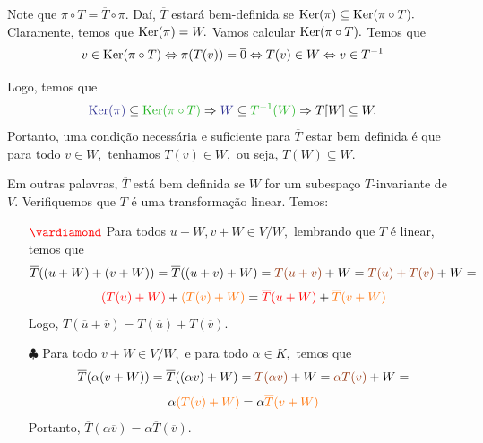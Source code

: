 \documentclass[11pt,a4paper]{article}
\begin{document}
{{\begin{center}

\end{center}
Note que $\pi \circ T = \overline{T} \circ \pi.$ Daí, $\overline{T}$ estará bem-definida se $\operatorname{Ker}(\pi) \subseteq \operatorname{Ker}(\pi \circ T).$ Claramente, temos que $\operatorname{Ker}(\pi) = W.$ Vamos calcular $ \operatorname{Ker}(\pi \circ T).$ Temos que
\[v \in \operatorname{Ker}(\pi \circ T) \Leftrightarrow  \pi ( T(v)) = \overline{0} \Leftrightarrow T(v) \in W \Leftrightarrow v \in T^{-1}\]

Logo, temos que 
\[\textcolor{Blue}{\Ker(\pi)} \subseteq \textcolor{Verde}{\Ker(\pi \circ T)} \Rightarrow \textcolor{Blue}{W} \subseteq \textcolor{Verde}{T^{-1}(W)} \Rightarrow T[W] \subseteq W.\]
Portanto, uma condição necessária e suficiente para $\overline{T}$ estar bem definida é que para todo $v \in W,$ tenhamos $T(v) \in W,$ ou seja, $T(W) \subseteq W.$

Em outras palavras, $\overline{T}$ está bem definida se $W$ for um subespaço $T$-invariante de $V.$
    \task[\pers{b}] Verifiquemos que $\overline{T}$ é uma transformação linear. Temos:
    \begin{itemize}
        \item[$\textcolor{red}{\vardiamond}$] Para todos $u + W, v + W \in V/W,$ lembrando que $T$ é linear, temos que
     \[        \overline{T}((u+W) + (v + W)) = \overline{T}((u+v)+ W) = \textcolor{RawSienna}{T(u+v)} + W = \textcolor{RawSienna}{T(u)+T(v)}+ W = \]\[\textcolor{red}{(T(u) + W)} + \textcolor{Laranja}{(T(v) + W)} = \textcolor{red}{\overline{T}(u+W)} + \textcolor{Laranja}{\overline{T}(v+W)}      \]
        Logo, $\overline{T}(\overline{u}+\overline{v}) = \overline{T}(\overline{u})+ \overline{T}(\overline{v}).$
        \end{itemize}
        }
        \newpage
        \begin{itemize}
       \item[$\clubsuit$] Para todo $v + W \in V/W,$ e para todo $\alpha \in K,$ temos que
       \[         \overline{T}(\alpha(v+W)) = \overline{T}( (\alpha v)+W) = \textcolor{RawSienna}{T(\alpha v)} + W = \textcolor{RawSienna}{\alpha T(v)} + W =  \]\[ \alpha \textcolor{Laranja}{(T(v) +W)} = \alpha \textcolor{Laranja}{\overline{T}(v + W)}       \]
        Portanto, $\overline{T}(\alpha \overline{v}) = \alpha \overline{T}(\overline{v}).$
    \end{itemize}
    
}
\end{document}
